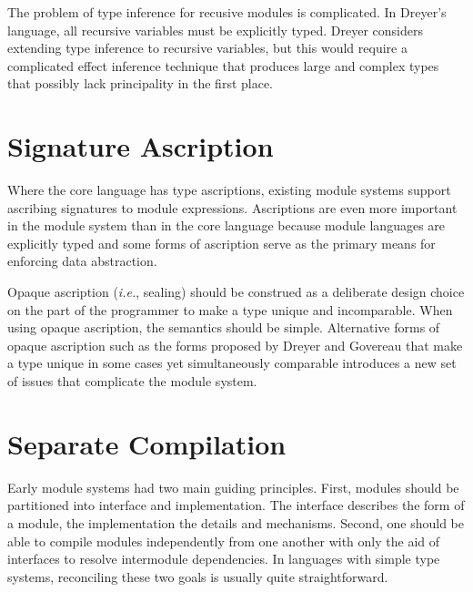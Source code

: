 The problem of type inference for recusive modules is complicated. In Dreyer's language, all recursive variables must be explicitly typed. Dreyer considers extending type inference to recursive variables, but this would require a complicated effect inference technique that produces large and complex types that possibly lack principality in the first place. 


\section{Signature Ascription}
Where the core language has type ascriptions, existing module systems support ascribing signatures to module expressions. Ascriptions are even more important in the module system than in the core language because module languages are explicitly typed and some forms of ascription serve as the primary means for enforcing data abstraction. 
 
Opaque ascription (\emph{i.e.}, sealing) should be construed as a deliberate design choice on the part of the programmer to make a type unique and incomparable. When using opaque ascription, the semantics should be simple. Alternative forms of opaque ascription such as the forms proposed by Dreyer \cite{dreyerthesis} and Govereau \cite{govereau:tr05} that make a type unique in some cases yet simultaneously comparable introduces a new set of issues that complicate the module system.    

\section{Separate Compilation}
Early module systems had two main guiding principles. First, modules should be partitioned into interface and implementation. The interface describes the form of a module, the implementation the details and mechanisms. Second, one should be able to compile modules independently from one another with only the aid of interfaces to resolve intermodule dependencies. In languages with simple type systems, reconciling these two goals is usually quite straightforward. 

